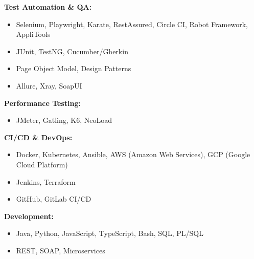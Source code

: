 \documentclass[11pt,a4paper]{article}
\begin{document}
\begin{minipage}[t]{0.48\textwidth}
\textbf{Test Automation \& QA:}
\begin{itemize}[leftmargin=10pt]
    \item Selenium, Playwright, Karate, RestAssured, Circle CI, Robot Framework, AppliTools
    \item JUnit, TestNG, Cucumber/Gherkin
    \item Page Object Model, Design Patterns
    \item Allure, Xray, SoapUI
\end{itemize}

\textbf{Performance Testing:}
\begin{itemize}[leftmargin=10pt]
    \item JMeter, Gatling, K6, NeoLoad
\end{itemize}

\textbf{CI/CD \& DevOps:}
\begin{itemize}[leftmargin=10pt]
    \item Docker, Kubernetes, Ansible, AWS (Amazon Web Services), GCP (Google Cloud Platform)
    \item Jenkins, Terraform
    \item GitHub, GitLab CI/CD
\end{itemize}

\textbf{Development:}
\begin{itemize}[leftmargin=10pt]
    \item Java, Python, JavaScript, TypeScript, Bash, SQL, PL/SQL
    \item REST, SOAP, Microservices
\end{itemize}
\end{minipage}
\hfill
\end{document}
